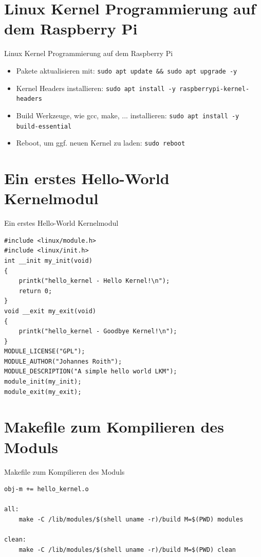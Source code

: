 \documentclass[aspectratio=169]{beamer}
\begin{document}
\section{Linux Kernel Programmierung auf dem Raspberry Pi}
\begin{frame}[fragile]{Linux Kernel Programmierung auf dem Raspberry Pi}
	\begin{itemize}
		\item Pakete aktualisieren mit: \lstinline|sudo apt update && sudo apt upgrade -y|
		\item Kernel Headers installieren: \lstinline|sudo apt install -y raspberrypi-kernel-headers|
		\item Build Werkzeuge, wie gcc, make, ... installieren: \lstinline|sudo apt install -y build-essential|
		\item Reboot, um ggf. neuen Kernel zu laden: \lstinline|sudo reboot|
	\end{itemize}
\end{frame}

\section{Ein erstes Hello-World Kernelmodul}
\begin{frame}[fragile]{Ein erstes Hello-World Kernelmodul}
	\begin{lstlisting}
#include <linux/module.h>
#include <linux/init.h>
int __init my_init(void)
{
	printk("hello_kernel - Hello Kernel!\n");
	return 0;
}
void __exit my_exit(void)
{
	printk("hello_kernel - Goodbye Kernel!\n");
}
MODULE_LICENSE("GPL");
MODULE_AUTHOR("Johannes Roith");
MODULE_DESCRIPTION("A simple hello world LKM");
module_init(my_init);
module_exit(my_exit);
	\end{lstlisting}
\end{frame}

\section{Makefile zum Kompilieren des Moduls}
\begin{frame}[fragile]{Makefile zum Kompilieren des Moduls}
	\begin{lstlisting}
obj-m += hello_kernel.o

all:
	make -C /lib/modules/$(shell uname -r)/build M=$(PWD) modules

clean:
	make -C /lib/modules/$(shell uname -r)/build M=$(PWD) clean
	\end{lstlisting}
\end{frame}
\end{document}
